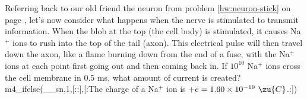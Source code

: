 Referring back to our old friend the neuron from problem \ref{hw:neuron-stick} on page \pageref{hw:neuron-stick},
        let's now consider what
        happens when the nerve is stimulated to transmit information.
         When the blob at the top (the cell body) is stimulated, it
        causes Na$^+$ ions to rush into the top of the tail (axon). 
        This electrical pulse will then travel down the axon, like a
        flame burning down from the end of a fuse, with the Na$^+$ ions
        at each point first going out and then coming back in.  If
        $10^{10}$  Na$^+$ ions cross the cell membrane in 0.5 ms, what
        amount of current is created?
m4_ifelse(__sn,1,[::],[:The
charge of a Na$^+$ ion is $+e=1.60\times10^{-19}\ \zu{C}$.:])
        \answercheck

